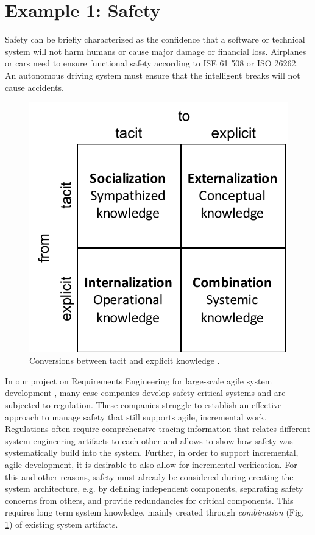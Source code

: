 \section{Example 1: Safety}

Safety can be briefly characterized as the confidence that a software or technical system will not harm humans or cause major damage or financial loss. Airplanes or cars need to ensure functional safety according to ISE 61 508 or ISO 26262. An autonomous driving system must ensure that the intelligent breaks will not cause accidents.

\begin{figure}[t]
    \centering
    \includegraphics[width=0.5\columnwidth]{figs/nonaka95}
    \caption{Conversions between tacit and explicit knowledge \cite{Nonaka1995}.}
    \label{fig:nonaka1995}
\end{figure}

In our project on Requirements Engineering for large-scale agile system development \cite{Kasauli2017a}, many case companies develop safety critical systems and are subjected to regulation. 
These companies struggle to establish an effective approach to manage safety that still supports agile, incremental work. 
Regulations often require comprehensive tracing information that relates different system engineering artifacts to each other and allows to show how safety was systematically build into the system.
Further, %
in order to support incremental, agile development, it is desirable to also allow for incremental verification. 
For this and other reasons, safety must already be considered during creating the system architecture, e.g. by defining independent components, separating safety concerns from others, and provide redundancies for critical components.
This requires long term system knowledge, mainly created through \emph{combination} (Fig. \ref{fig:nonaka1995}) of existing system artifacts.

